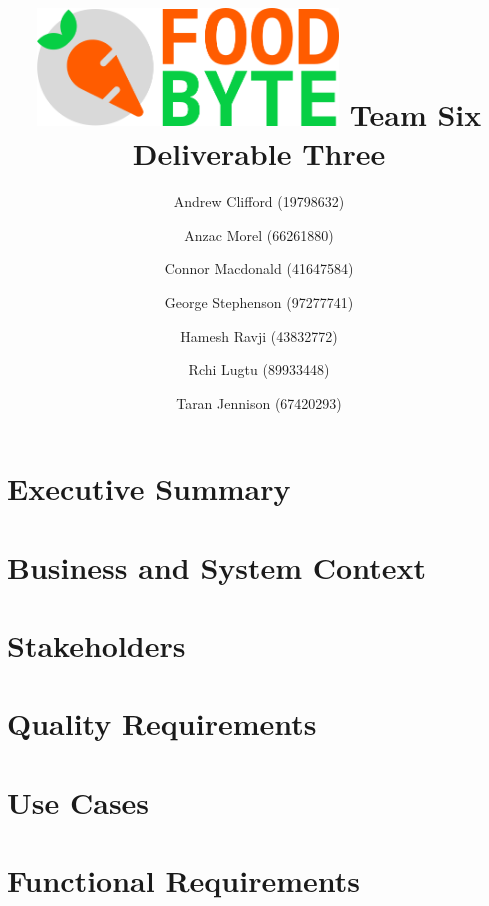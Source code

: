 \documentclass{article}
\begin{document}
	\title{\includegraphics[width=8cm]{images/logo_main.png}\linebreak
		   Team Six Deliverable Three}
	\author{Andrew Clifford (19798632)
		    \and Anzac Morel (66261880)
	    	\and Connor Macdonald (41647584)
    		\and George Stephenson (97277741)
    		\and Hamesh Ravji (43832772)
    		\and Rchi Lugtu (89933448)
    		\and Taran Jennison (67420293)}
	\maketitle
	\pagebreak
	\tableofcontents
	\pagebreak
	
	\section{Executive Summary} 
	
	\pagebreak
	
	\section{Business and System Context}
	
	\pagebreak
	
	\section{Stakeholders}
	
	\pagebreak
	
	\section{Quality Requirements}
	
	\pagebreak
	
	\section{Use Cases}
	
	\pagebreak
	
	\section{Functional Requirements}
	
	\pagebreak
	
\end{document}
